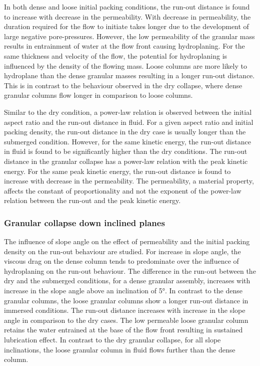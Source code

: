 In both dense and loose initial packing conditions, the run-out distance is 
found to increase with decrease in the permeability. With decrease in 
permeability, the duration required for the flow to initiate takes longer due 
to the development of large negative pore-pressures. However, the low 
permeability of the granular mass results in entrainment of water at the flow 
front causing 
hydroplaning. For the same thickness and velocity of the flow, the potential 
for 
hydroplaning is influenced by the density of the flowing mass. Loose columns 
are more likely to hydroplane than the dense granular masses resulting in 
a longer run-out distance. This is in contrast to the behaviour observed in the 
dry collapse, where dense granular columns flow longer in comparison to loose 
columns.

Similar to the dry condition, a power-law relation is observed between the 
initial aspect ratio and the run-out distance in fluid. For a given 
aspect ratio and initial packing density, the run-out distance in the dry case 
is usually longer than the submerged condition. However, for the same kinetic 
energy, the run-out distance in fluid is found to be significantly higher than 
the dry conditions. The run-out distance in the granular collapse has a 
power-law relation with the peak kinetic energy. For the same peak kinetic 
energy, the run-out distance is found to increase with decrease in the 
permeability. The permeability, a material property, affects the constant of 
proportionality and not the exponent of the power-law relation between the 
run-out and the peak kinetic energy.


\subsubsection*{Granular collapse down inclined planes}

The influence of slope angle on the effect of permeability and the initial 
packing density on the run-out behaviour are studied. For increase in slope 
angle, the viscous drag on the dense column tends to predominate over the 
influence of hydroplaning on the run-out behaviour. The difference in the 
run-out between the dry and the submerged conditions, for a dense granular 
assembly, increases with increase in the slope angle above an inclination of 
5\si{\degree}. In contrast to the dense granular columns, the loose granular 
columns show a longer run-out distance in immersed conditions. The run-out 
distance increases with increase in the slope angle in comparison to the dry 
cases. The low permeable loose granular column retains the water entrained at 
the base of the flow front resulting in sustained lubrication effect. In 
contrast to the dry granular collapse, for all slope inclinations, the loose 
granular column in fluid flows further than the dense column. 

